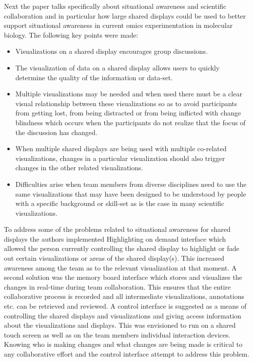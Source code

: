 \documentclass{sig-alternate}
\begin{document}
Next the paper talks specifically about situational awareness and scientific
collaboration and in particular how large shared displays could be used to
better support situational awareness in current omics experimentation in
molecular biology. The following key points were made:
\begin{itemize}
\item Visualizations on a shared display encourages group discussions.
\item The visualization of data on a shared display allows users to quickly
determine the quality of the information or data-set.
\item Multiple visualizations may be needed and when used there must be a
clear visual relationship between these visualizations so as to avoid
participants from getting lost, from being distracted or from being inflicted
with change blindness which occurs when the participants do not realize that the
focus of the discussion has changed.

\item When multiple shared displays are being used with multiple co-related
visualizations, changes in a particular visualization should also trigger
changes in the other related visualizations.
\item Difficulties arise when team members from diverse disciplines need to
use the same visualizations that may have been designed to be understood by
people with a specific background or skill-set as is the case in many
scientific visualizations.
\end{itemize}
To address some of the problems related to situational awareness for shared
displays the authors implemented Highlighting on demand interface which allowed
the person currently controlling the shared display to highlight or fade out
certain visualizations or areas of the shared display(s). This increased
awareness among the team as to the relevant visualization at that moment. A
second solution was the memory board interface which stores and visualizes the
changes in real-time during team collaboration. This ensures that the entire
collaborative process is recorded and all intermediate visualizations,
annotations etc. can be retrieved and reviewed. A control interface is
suggested as a means of controlling the shared displays and visualizations and
giving access information about the visualizations and displays. This
was envisioned to run on a shared touch screen as well as on the team members
individual interaction devices. Knowing who is making changes and what changes
are being made is critical to any collaborative effort and the control interface
attempt to address this problem.
\end{document}

